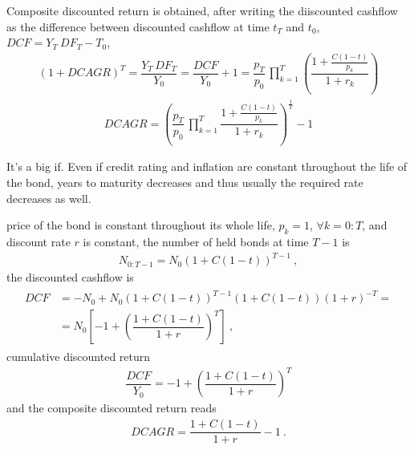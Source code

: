 \documentclass[letterpaper,10pt,english]{jupyterBook}
\begin{document}
\sphinxAtStartPar
Composite discounted return is obtained, after writing the diiscounted cashflow as the difference between discounted cashflow at time \(t_T\) and \(t_0\), \(DCF = Y_T \ DF_T - T_0\),
\begin{equation*}
\begin{split}(1 + DCAGR)^T = \dfrac{Y_T \, DF_T}{Y_0} = \dfrac{DCF}{Y_0} + 1 = \dfrac{p_T}{p_0} \, \prod_{k=1}^{T} \left( \dfrac{ 1+ \frac{C(1-t)}{p_k} }{1+r_k} \right)\end{split}
\end{equation*}\begin{equation*}
\begin{split}DCAGR = \left( \dfrac{p_T}{p_0} \, \prod_{k=1}^{T}  \dfrac{ 1+ \frac{C(1-t)}{p_k} }{1+r_k} \right)^{\frac{1}{T}} - 1\end{split}
\end{equation*}
\sphinxAtStartPar
{}%
\begin{footnote}[1]\sphinxAtStartFootnote
It’s a big if. Even if credit rating and inflation are constant throughout the life of the bond, years to maturity decreases and thus \sphinxhyphen{} usually \sphinxhyphen{} the required rate decreases as well.
%
\end{footnote} price of the bond is constant throughout its whole life, \(p_k = 1\), \(\forall k=0:T\), and discount rate \(r\) is constant, the number of held bonds at time \(T-1\) is
\begin{equation*}
\begin{split}N_{0:T-1} = N_0 \left( 1 + C(1-t) \right)^{T-1} \ ,\end{split}
\end{equation*}
\sphinxAtStartPar
the discounted cashflow is
\begin{equation*}
\begin{split}\begin{aligned}
  DCF 
  & = - N_0 + N_0 \left( 1 + C(1-t) \right)^{T-1} ( 1 + C(1-t) ) \left( 1 + r \right)^{-T} = \\
  & = N_0 \left[ - 1 +  \left( \dfrac{ 1 + C(1-t) }{ 1 + r } \right)^{T} \right] \ ,
\end{aligned}\end{split}
\end{equation*}
\sphinxAtStartPar
cumulative discounted return
\begin{equation*}
\begin{split}\dfrac{DCF}{Y_0} = - 1 + \left( \dfrac{ 1 + C(1-t) }{ 1 + r } \right)^{T}\end{split}
\end{equation*}
\sphinxAtStartPar
and the composite discounted return reads
\begin{equation*}
\begin{split}DCAGR = \dfrac{1 + C(1-t)}{1+r} - 1 \ .\end{split}
\end{equation*}
\end{document}
